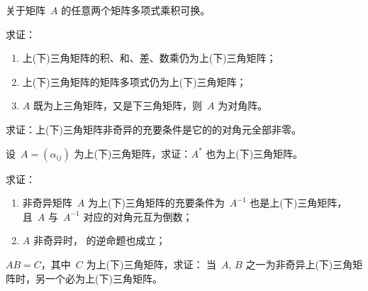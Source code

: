\documentclass[twoside,openright]{book}
\begin{document}
\begin{CJK*}{UTF8}{}
\begin{quest}
\label{quest:38}
关于矩阵\ $A$ 的任意两个矩阵多项式乘积可换。
\end{quest}

\begin{quest}
\label{quest:39}
求证：
\begin{enumerate}
\item
上(下)三角矩阵的积、和、差、数乘仍为上(下)三角矩阵；
\item
上(下)三角矩阵的矩阵多项式仍为上(下)三角矩阵；
\item
$A$ 既为上三角矩阵，又是下三角矩阵，则\ $A$ 为对角阵。
\end{enumerate}
\end{quest}

\begin{quest}
\label{quest:40}
求证：上(下)三角矩阵非奇异的充要条件是它的的对角元全部非零。
\end{quest}

\begin{quest}
\label{quest:41}
设\ $A=(\alpha_{ij})$ 为上(下)三角矩阵，求证：$A^*$ 也为上(下)三角矩阵。
\end{quest}

\begin{quest}
\label{quest:42}
求证：
\begin{enumerate}
\item
非奇异矩阵\ $A$ 为上(下)三角矩阵的充要条件为\ $A^{-1}$ 也是上(下)三角矩阵，
且\ $A$ 与\ $A^{-1}$ 对应的对角元互为倒数；
\item
$A$ 非奇异时，{} 的逆命题也成立；
\end{enumerate}
\end{quest}

\begin{quest}
\label{quest:43}
$AB=C$，其中\ $C$ 为上(下)三角矩阵，求证：
当\ $A$, $B$ 之一为非奇异上(下)三角矩阵时，另一个必为上(下)三角矩阵。
\end{quest}


\end{CJK*}
\end{document}
